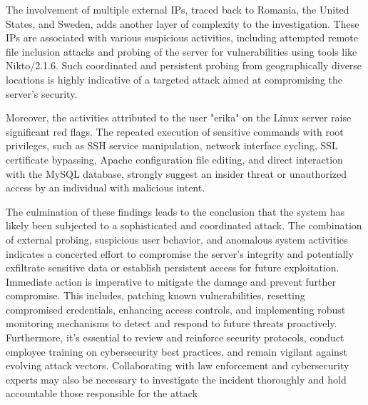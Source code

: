 \noindent The involvement of multiple external IPs, traced back to Romania, the United States, and Sweden, adds another layer of complexity to the investigation. These IPs are associated with various suspicious activities, including attempted remote file inclusion attacks and probing of the server for vulnerabilities using tools like Nikto/2.1.6. Such coordinated and persistent probing from geographically diverse locations is highly indicative of a targeted attack aimed at compromising the server's security.
\newline

\noindent Moreover, the activities attributed to the user "erika" on the Linux server raise significant red flags. The repeated execution of sensitive commands with root privileges, such as SSH service manipulation, network interface cycling, SSL certificate bypassing, Apache configuration file editing, and direct interaction with the MySQL database, strongly suggest an insider threat or unauthorized access by an individual with malicious intent.
\newline

\noindent The culmination of these findings leads to the conclusion that the system has likely been subjected to a sophisticated and coordinated attack. The combination of external probing, suspicious user behavior, and anomalous system activities indicates a concerted effort to compromise the server's integrity and potentially exfiltrate sensitive data or establish persistent access for future exploitation. Immediate action is imperative to mitigate the damage and prevent further compromise. This includes, patching known vulnerabilities, resetting compromised credentials, enhancing access controls, and implementing robust monitoring mechanisms to detect and respond to future threats proactively. Furthermore, it's essential to review and reinforce security protocols, conduct employee training on cybersecurity best practices, and remain vigilant against evolving attack vectors. Collaborating with law enforcement and cybersecurity experts may also be necessary to investigate the incident thoroughly and hold accountable those responsible for the attack






















